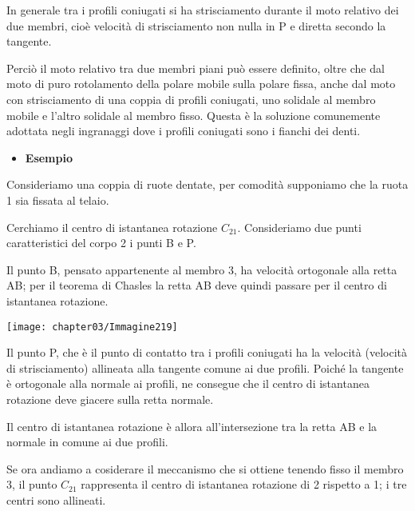 In generale tra i profili coniugati si ha strisciamento durante il moto relativo dei due membri, cioè velocità di strisciamento non nulla in P e diretta secondo la tangente.

Perciò il moto relativo tra due membri piani può essere definito, oltre che dal moto di puro rotolamento della polare mobile sulla polare fissa, anche dal moto con strisciamento di una coppia di profili coniugati, uno solidale al membro mobile e l'altro solidale al membro fisso. Questa è la soluzione comunemente adottata negli ingranaggi dove i profili coniugati sono i fianchi dei denti.

\begin{itemize}
\item \textbf{Esempio}
\end{itemize}

\begin{minipage}{.7\textwidth}
Consideriamo una coppia di ruote dentate, per comodità supponiamo che la ruota 1 sia fissata al telaio.

Cerchiamo il centro di istantanea rotazione $C_{21}$. Consideriamo due punti caratteristici del corpo 2 i punti B e P.

Il punto B, pensato appartenente al membro 3, ha velocità ortogonale alla retta AB; per il teorema di Chasles la retta AB deve quindi passare per il centro di istantanea rotazione.
\end{minipage}
\hfill
\begin{minipage}{.3\textwidth}
\centering
\texttt{[image: chapter03/Immagine219]}
\end{minipage}

Il punto P, che è il punto di contatto tra i profili coniugati ha la velocità (velocità di strisciamento) allineata alla tangente comune ai due profili. Poiché la tangente è ortogonale alla normale ai profili, ne consegue che il centro di istantanea rotazione deve giacere sulla retta normale.

Il centro di istantanea rotazione è allora all'intersezione tra la retta AB e la normale in comune ai due profili.

Se ora andiamo a cosiderare il meccanismo che si ottiene tenendo fisso il membro 3, il punto $C_{21}$ rappresenta il centro di istantanea rotazione di 2 rispetto a 1; i tre centri sono allineati.